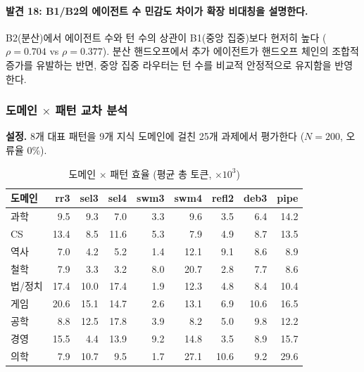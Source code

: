 \paragraph{발견 18: B1/B2의 에이전트 수 민감도 차이가 확장 비대칭을 설명한다.}
B2(분산)에서 에이전트 수와 턴 수의 상관이 B1(중앙 집중)보다 현저히 높다 ($\rho=0.704$ vs $\rho=0.377$). 분산 핸드오프에서 추가 에이전트가 핸드오프 체인의 조합적 증가를 유발하는 반면, 중앙 집중 라우터는 턴 수를 비교적 안정적으로 유지함을 반영한다.

\subsubsection{도메인 $\times$ 패턴 교차 분석}

\textbf{설정.} 8개 대표 패턴을 9개 지식 도메인에 걸친 25개 과제에서 평가한다 ($N=200$, 오류율 0\%).

\begin{table}[H]
\centering
\caption{도메인 $\times$ 패턴 효율 (평균 총 토큰, $\times 10^{3}$)}
\label{tab:domain-pattern}
{\footnotesize
\begin{tabular}{lrrrrrrrr}
\toprule
도메인 & rr3 & sel3 & sel4 & swm3 & swm4 & refl2 & deb3 & pipe \\
\midrule
과학     & 9.5  & 9.3  & 7.0  & 3.3  & 9.6  & 3.5  & 6.4  & 14.2 \\
CS       & 13.4 & 8.5  & 11.6 & 5.3  & 7.9  & 4.9  & 8.7  & 13.5 \\
역사     & 7.0  & 4.2  & 5.2  & 1.4  & 12.1 & 9.1  & 8.6  & 8.9  \\
철학     & 7.9  & 3.3  & 3.2  & 8.0  & 20.7 & 2.8  & 7.7  & 8.6  \\
법/정치  & 17.4 & 10.0 & 17.4 & 1.9  & 12.3 & 4.8  & 8.4  & 10.4 \\
게임     & 20.6 & 15.1 & 14.7 & 2.6  & 13.1 & 6.9  & 10.6 & 16.5 \\
공학     & 8.8  & 12.5 & 17.8 & 3.9  & 8.2  & 5.0  & 9.8  & 12.2 \\
경영     & 15.5 & 4.4  & 13.9 & 9.2  & 14.8 & 3.5  & 8.9  & 15.7 \\
의학     & 7.9  & 10.7 & 9.5  & 1.7  & 27.1 & 10.6 & 9.2  & 29.6 \\
\bottomrule
\end{tabular}
}
\end{table}

